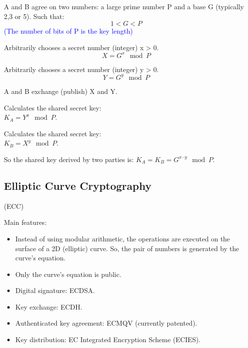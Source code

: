 \begin{center}
    A and B agree on two numbers: a large prime number P and a base G (typically 2,3 or 5). Such that:
    \[
        1 < G < P
    \]
    \textcolor{Blue}{(The number of bits of P is the key length)}
\end{center}

\begin{multicols}{2}
    \centering
    Arbitrarily chooses a secret number (integer) x > 0.
    \[
        X= G^x \mod P
    \]
    \columnseprule=1pt
    \columnbreak
    
    Arbitrarily chooses a secret number (integer) y > 0.
    \[
        Y= G^y \mod P
    \]
\end{multicols}

\begin{center}
    A and B exchange (publish) X and Y.
\end{center}

\begin{multicols}{2}
    \centering
    Calculates the shared secret key: \\ $K_A = Y^x \mod P$.
    
    \columnseprule=1pt
    \columnbreak

    Calculates the shared secret key: \\ $K_B = X^y \mod P$.
\end{multicols}

\vspace{1 cm}

So the shared key derived by two parties is: $K_A = K_B=G^{x\cdot y}\mod P$.

\subsection{Elliptic Curve Cryptography}
\begin{center}
    (ECC)
\end{center}
Main features:
\begin{itemize}
    \item Instead of using modular arithmetic, the operations are executed on the surface of a 2D (elliptic) curve. So, the pair of numbers is generated by the curve's equation. 
    \item Only the curve's equation is public.
    \item Digital signature: ECDSA.
    \item Key exchange: ECDH.
    \item Authenticated key agreement: ECMQV (currently patented).
    \item Key distribution: EC Integrated Encryption Scheme (ECIES).
\end{itemize}

